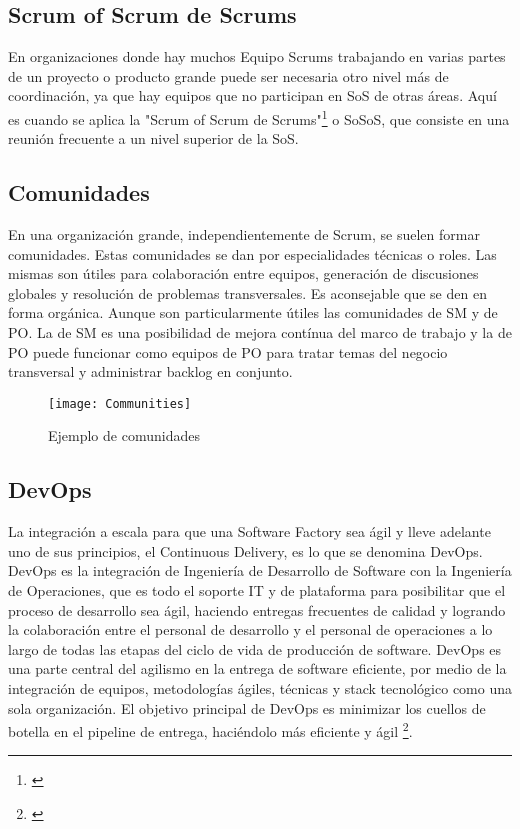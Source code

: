 \subsection{Scrum of Scrum de Scrums}

En organizaciones donde hay muchos Equipo Scrums trabajando en varias partes de un proyecto o producto grande puede ser necesaria otro nivel más de coordinación, ya que hay equipos que no participan en SoS de otras áreas. Aquí es cuando se aplica la "Scrum of Scrum de Scrums"\footnote{\cite{SBOK-2013}} o SoSoS, que consiste en una reunión frecuente a un nivel superior de la SoS.

\subsection{Comunidades}

En una organización grande, independientemente de Scrum, se suelen formar comunidades. Estas comunidades se dan por especialidades técnicas o roles. Las mismas son útiles para colaboración entre equipos, generación de discusiones globales y resolución de problemas transversales. Es aconsejable que se den en forma orgánica. Aunque son particularmente útiles las comunidades de SM y de PO. La de SM es una posibilidad de mejora contínua del marco de trabajo y la de PO puede funcionar como equipos de PO para tratar temas del negocio transversal y administrar backlog en conjunto.

\begin{figure}[h]
  \centering
  \texttt{[image: Communities]}
  \caption{Ejemplo de comunidades}
  \centering
  \label{fig:Communities} %
\end{figure}


\subsection{DevOps}


La integración a escala para que una Software Factory sea ágil y lleve adelante uno de sus principios, el Continuous Delivery, es lo que se denomina DevOps. DevOps es la integración de Ingeniería de Desarrollo de Software con la Ingeniería de Operaciones, que es todo el soporte IT y de plataforma para posibilitar que el proceso de desarrollo sea ágil, haciendo entregas frecuentes de calidad y logrando la colaboración entre el personal de desarrollo y el personal de operaciones a lo largo de todas las etapas del ciclo de vida de producción de software. DevOps es una parte central del agilismo en la entrega de software eficiente, por medio de la integración de equipos, metodologías ágiles, técnicas y stack tecnológico como una sola organización. El objetivo principal de DevOps es minimizar los cuellos de botella en el pipeline de entrega, haciéndolo más eficiente y ágil \footnote{\cite{DevOps-for-dummies-2015}}.

